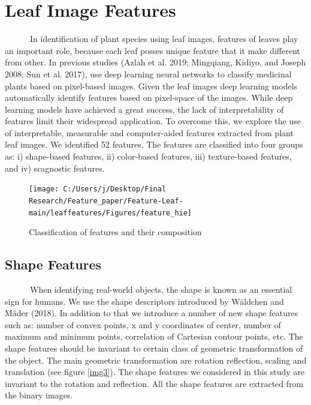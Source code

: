 \documentclass{article}
\begin{document}
\hypertarget{leaf-image-features}{%
\section{Leaf Image Features}\label{leaf-image-features}}

~~~~~~In identification of plant species using leaf images, features of
leaves play an important role, because each leaf posses unique feature
that it make different from other. In previous studies (Azlah et al.
2019; Mingqiang, Kidiyo, and Joseph 2008; Sun et al. 2017), use deep
learning neural networks to classify medicinal plants based on
pixel-based images. Given the leaf images deep learning models
automatically identify features based on pixel-space of the images.
While deep learning models have achieved a great success, the lack of
interpretability of features limit their widespread application. To
overcome this, we explore the use of interpretable, measurable and
computer-aided features extracted from plant leaf images. We identified
52 features. The features are classified into four groups as: i)
shape-based features, ii) color-based features, iii) texture-based
features, and iv) scagnostic features.

\begin{figure}[!ht]

{\centering \texttt{[image: C:/Users/j/Desktop/Final Research/Feature\_paper/Feature-Leaf-main/leaffeatures/Figures/feature\_hie]} 

}

\caption{\label{img33}Classification of features and their composition}\label{fig:unnamed-chunk-10}
\end{figure}

\hypertarget{shape-features}{%
\subsection{Shape Features}\label{shape-features}}

~~~~~~When identifying real-world objects, the shape is known as an
essential sign for humans. We use the shape descriptors introduced by
Wäldchen and Mäder (2018). In addition to that we introduce a number of
new shape features such as: number of convex points, x and y coordinates
of center, number of maximum and minimum points, correlation of
Cartesian contour points, etc. The shape features should be invariant to
certain class of geometric transformation of the object. The main
geometric transformation are rotation reflection, scaling and
translation (see figure \ref{img3}). The shape features we considered in
this study are invariant to the rotation and reflection. All the shape
features are extracted from the binary images.
\end{document}
